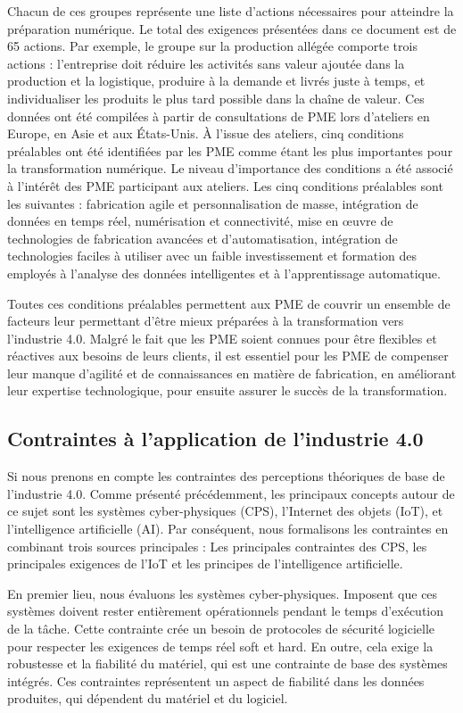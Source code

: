 Chacun de ces groupes représente une liste d'actions nécessaires pour atteindre la préparation numérique.  Le total des exigences présentées dans ce document est de 65 actions. Par exemple, le groupe sur la production allégée comporte trois actions : l'entreprise doit réduire les activités sans valeur ajoutée dans la production et la logistique, produire à la demande et livrés juste à temps, et individualiser les produits le plus tard possible dans la chaîne de valeur.  Ces données ont été compilées à partir de consultations de PME lors d'ateliers en Europe, en Asie et aux États-Unis. À l'issue des ateliers, cinq conditions préalables ont été identifiées par les PME comme étant les plus importantes pour la transformation numérique. Le niveau d'importance des conditions a été associé à l'intérêt des PME participant aux ateliers.  Les cinq conditions préalables sont les suivantes : fabrication agile et personnalisation de masse, intégration de données en temps réel, numérisation et connectivité, mise en œuvre de technologies de fabrication avancées et d'automatisation, intégration de technologies faciles à utiliser avec un faible investissement et formation des employés à l'analyse des données intelligentes et à l'apprentissage automatique.

Toutes ces conditions préalables permettent aux PME de couvrir un ensemble de facteurs leur permettant d'être mieux préparées à la transformation vers l'industrie 4.0. Malgré le fait que les PME soient connues pour être flexibles et réactives aux besoins de leurs clients, il est essentiel pour les PME de compenser leur manque d'agilité et de connaissances en matière de fabrication, en améliorant leur expertise technologique, pour ensuite assurer le succès de la transformation.

\subsection{Contraintes à l'application de l'industrie 4.0
}
Si nous prenons en compte les contraintes des perceptions théoriques de base de l'industrie 4.0. Comme présenté précédemment, les principaux concepts autour de ce sujet sont les systèmes cyber-physiques (CPS), l'Internet des objets (IoT), et l'intelligence artificielle (AI). Par conséquent, nous formalisons les contraintes en combinant trois sources principales : Les principales contraintes des CPS, les principales exigences de l'IoT et les principes de l'intelligence artificielle.

En premier lieu, nous évaluons les systèmes cyber-physiques. Imposent que ces systèmes doivent rester entièrement opérationnels pendant le temps d'exécution de la tâche. Cette contrainte crée un besoin de protocoles de sécurité logicielle pour respecter les exigences de temps réel soft et hard. En outre, cela exige la robustesse et la fiabilité du matériel, qui est une contrainte de base des systèmes intégrés. Ces contraintes représentent un aspect de fiabilité dans les données produites, qui dépendent du matériel et du logiciel. 

